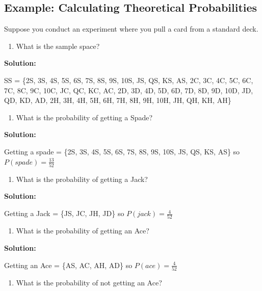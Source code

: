 \documentclass[
]{book}
\providecommand{\tightlist}{%
  \setlength{\itemsep}{0pt}\setlength{\parskip}{0pt}}
\begin{document}
\hypertarget{example-calculating-theoretical-probabilities-1}{%
\subsection{Example: Calculating Theoretical Probabilities}\label{example-calculating-theoretical-probabilities-1}}

Suppose you conduct an experiment where you pull a card from a standard deck.

\begin{enumerate}
\def\labelenumi{\alph{enumi}.}
\tightlist
\item
  What is the sample space?
\end{enumerate}

\textbf{Solution:}

SS = \{2S, 3S, 4S, 5S, 6S, 7S, 8S, 9S, 10S, JS, QS, KS, AS, 2C, 3C, 4C, 5C, 6C, 7C, 8C, 9C, 10C, JC, QC, KC, AC, 2D, 3D, 4D, 5D, 6D, 7D, 8D, 9D, 10D, JD, QD, KD, AD, 2H, 3H, 4H, 5H, 6H, 7H, 8H, 9H, 10H, JH, QH, KH, AH\}

\begin{enumerate}
\def\labelenumi{\alph{enumi}.}
\setcounter{enumi}{1}
\tightlist
\item
  What is the probability of getting a Spade?
\end{enumerate}

\textbf{Solution:}

Getting a spade = \{2S, 3S, 4S, 5S, 6S, 7S, 8S, 9S, 10S, JS, QS, KS, AS\} so \(P(spade)=\frac{13}{52}\)

\begin{enumerate}
\def\labelenumi{\alph{enumi}.}
\setcounter{enumi}{2}
\tightlist
\item
  What is the probability of getting a Jack?
\end{enumerate}

\textbf{Solution:}

Getting a Jack = \{JS, JC, JH, JD\} so \(P(jack)=\frac{4}{52}\)

\begin{enumerate}
\def\labelenumi{\alph{enumi}.}
\setcounter{enumi}{3}
\tightlist
\item
  What is the probability of getting an Ace?
\end{enumerate}

\textbf{Solution:}

Getting an Ace = \{AS, AC, AH, AD\} so \(P(ace)=\frac{4}{52}\)

\begin{enumerate}
\def\labelenumi{\alph{enumi}.}
\setcounter{enumi}{4}
\tightlist
\item
  What is the probability of not getting an Ace?
\end{enumerate}
\end{document}

